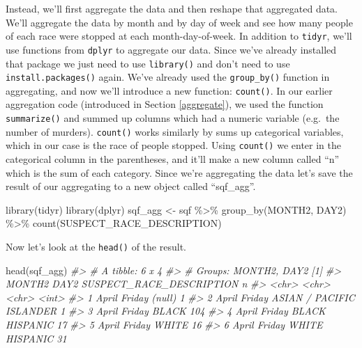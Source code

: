 \documentclass[
]{krantz}
\makeatletter
\newenvironment{Shaded}{\begin{snugshade}}{\end{snugshade}}
\newcommand{\CommentTok}[1]{\textcolor[rgb]{0.37,0.37,0.37}{\textit{#1}}}
\newcommand{\FunctionTok}[1]{\textcolor[rgb]{0,0,0}{#1}}
\newcommand{\NormalTok}[1]{#1}
\newcommand{\OtherTok}[1]{\textcolor[rgb]{0.37,0.37,0.37}{#1}}
\newcommand{\SpecialCharTok}[1]{\textcolor[rgb]{0,0,0}{#1}}
\newenvironment{kframe}{%
\medskip{}
\setlength{\fboxsep}{.8em}
 \def\at@end@of@kframe{}%
 \ifinner\ifhmode%
  \def\at@end@of@kframe{\end{minipage}}%
  \begin{minipage}{\columnwidth}%
 \fi\fi%
 \def\FrameCommand##1{\hskip\@totalleftmargin \hskip-\fboxsep
 \colorbox{shadecolor}{##1}\hskip-\fboxsep
     \hskip-\linewidth \hskip-\@totalleftmargin \hskip\columnwidth}%
 \MakeFramed {\advance\hsize-\width
   \@totalleftmargin\z@ \linewidth\hsize
   \@setminipage}}%
 {\par\unskip\endMakeFramed%
 \at@end@of@kframe}
\renewenvironment{Shaded}{\begin{kframe}}{\end{kframe}}
\makeatother
\begin{document}
Instead, we'll first aggregate the data and then reshape that aggregated data. We'll aggregate the data by month and by day of week and see how many people of each race were stopped at each month-day-of-week. In addition to \texttt{tidyr}, we'll use functions from \texttt{dplyr} to aggregate our data. Since we've already installed that package we just need to use \texttt{library()} and don't need to use \texttt{install.packages()} again. We've already used the \texttt{group\_by()} function in aggregating, and now we'll introduce a new function: \texttt{count()}. In our earlier aggregation code (introduced in Section \ref{aggregate}), we used the function \texttt{summarize()} and summed up columns which had a numeric variable (e.g.~the number of murders). \texttt{count()} works similarly by sums up categorical variables, which in our case is the race of people stopped. Using \texttt{count()} we enter in the categorical column in the parentheses, and it'll make a new column called ``n'' which is the sum of each category. Since we're aggregating the data let's save the result of our aggregating to a new object called ``sqf\_agg''.

\begin{Shaded}
\begin{Highlighting}[]
\FunctionTok{library}\NormalTok{(tidyr)}
\FunctionTok{library}\NormalTok{(dplyr)}
\NormalTok{sqf\_agg }\OtherTok{\textless{}{-}}\NormalTok{ sqf }\SpecialCharTok{\%\textgreater{}\%} 
  \FunctionTok{group\_by}\NormalTok{(MONTH2,}
\NormalTok{           DAY2) }\SpecialCharTok{\%\textgreater{}\%}
  \FunctionTok{count}\NormalTok{(SUSPECT\_RACE\_DESCRIPTION)}
\end{Highlighting}
\end{Shaded}

Now let's look at the \texttt{head()} of the result.

\begin{Shaded}
\begin{Highlighting}[]
\FunctionTok{head}\NormalTok{(sqf\_agg)}
\CommentTok{\#\textgreater{} \# A tibble: 6 x 4}
\CommentTok{\#\textgreater{} \# Groups:   MONTH2, DAY2 [1]}
\CommentTok{\#\textgreater{}   MONTH2 DAY2   SUSPECT\_RACE\_DESCRIPTION     n}
\CommentTok{\#\textgreater{}   \textless{}chr\textgreater{}  \textless{}chr\textgreater{}  \textless{}chr\textgreater{}                    \textless{}int\textgreater{}}
\CommentTok{\#\textgreater{} 1 April  Friday (null)                       1}
\CommentTok{\#\textgreater{} 2 April  Friday ASIAN / PACIFIC ISLANDER     1}
\CommentTok{\#\textgreater{} 3 April  Friday BLACK                      104}
\CommentTok{\#\textgreater{} 4 April  Friday BLACK HISPANIC              17}
\CommentTok{\#\textgreater{} 5 April  Friday WHITE                       16}
\CommentTok{\#\textgreater{} 6 April  Friday WHITE HISPANIC              31}
\end{Highlighting}
\end{Shaded}
\end{document}
